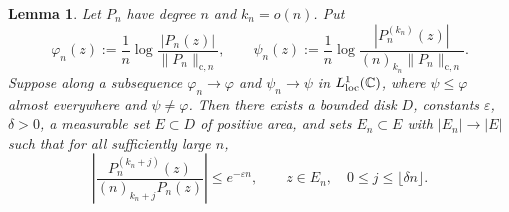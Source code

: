 \documentclass[10pt,reqno]{amsart}
\newtheorem{lemma}[theorem]{Lemma}
\theoremstyle{remark}
\newcommand{\C}{\mathbb C}
\begin{document}
\begin{lemma}\label{lem:spatial-gap-block}
    Let $P_n$ have degree $n$ and $k_n=o(n)$. Put
    \[\varphi_n(z):=\frac{1}{n}\log\frac{|P_n(z)|}{\|P_n\|_{\mathrm{c},n}},\qquad \psi_n(z):=\frac{1}{n}\log\frac{|P^{(k_n)}_n(z)|}{(n)_{k_n}\|P_n\|_{\mathrm{c},n}}.\]
    Suppose along a subsequence $\varphi_n\to\varphi$ and $\psi_n\to\psi$ in $L_{\rm loc}^1(\C)$, where $\psi\le \varphi$ almost everywhere and $\psi\neq \varphi$. Then there exists a bounded disk $D$, constants $\varepsilon$, $\delta>0$, a measurable set $E\subset D$ of positive area, and sets $E_n\subset E$ with $|E_n|\to |E|$ such that for all sufficiently large $n$,
    \[
    \left|\frac{P_n^{(k_n+j)}(z)}
    {(n)_{k_n+j}P_n(z)}\right|\le e^{-\varepsilon n},
    \qquad z\in E_n,\quad 0\le j\le\lfloor\delta n\rfloor.
    \]
\end{lemma}
\end{document}
